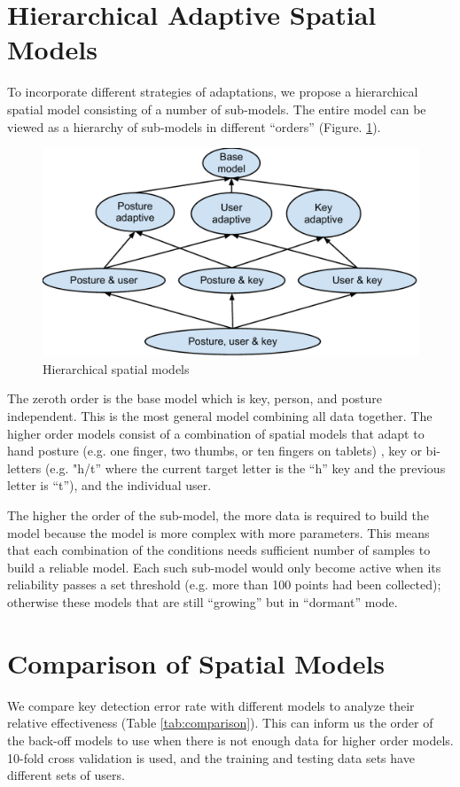 \documentclass{sigchi}
\begin{document}
\section{Hierarchical Adaptive Spatial Models}
To incorporate different strategies of adaptations, we propose a hierarchical
spatial model consisting of a number of sub-models.
The entire model can be viewed as a hierarchy of sub-models in different
“orders” (Figure. \ref{fig:hierarchy}).

\begin{figure}[tb]
  \centering
  \includegraphics[width=1\columnwidth]{figures/hierarchical-spatial-model.pdf}
  \caption{Hierarchical spatial models}
  \label{fig:hierarchy}
\end{figure}

The zeroth order is the base model which is key, person, and posture
independent. This is the most general model combining all data together. The
higher order models consist of a combination of spatial models that adapt to hand 
posture (e.g. one finger, two thumbs, or ten fingers on tablets) , key or 
bi-letters (e.g. "h/t” where the current target letter is the “h” key and the 
previous letter is “t”), and the individual user. 

The higher the order of the sub-model, the more data is required to build the model because
the model is more complex with more parameters. This means that each combination of the 
conditions needs sufficient number of samples to build a reliable model. Each 
such sub-model would only become active when its reliability passes a set 
threshold (e.g. more than 100 points had been collected); otherwise these models
 that are still “growing” but in “dormant” mode.

\section{Comparison of Spatial Models}
We compare key detection error rate with different models to analyze their
relative effectiveness (Table \ref{tab:comparison}). This can inform us the order of the
back-off models to use when there is not enough data for higher order models.
10-fold cross validation is used, and the training and testing data sets have
different sets of users.
\end{document}
